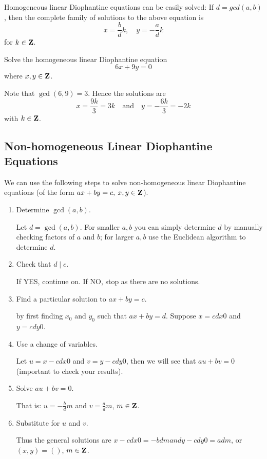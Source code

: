 Homogeneous linear Diophantine equations can be easily solved: If $d=gcd(a,b)$, then the complete family of solutions to the above equation is
\[x=\frac{b}{d}k,\quad y=-\frac{a}{d}k\]
for $k\in\mathbf Z$.

\begin{exercise}
Solve the homogeneous linear Diophantine equation
\[6x+9y=0\]
where $x,y\in\mathbf Z$.
\end{exercise}
\begin{solution}
Note that $\gcd(6,9)=3$. Hence the solutions are
\[x=\frac{9k}{3}=3k \quad \text{and} \quad y=-\frac{6k}{3}=-2k\]
with $k\in\mathbf Z$.
\end{solution}

\subsection{Non-homogeneous Linear Diophantine Equations}
We can use the following steps to solve non-homogeneous linear Diophantine equations (of the form $ax+by=c,\:x,y\in\mathbf Z$).

\begin{enumerate}
\item Determine $\gcd(a,b)$.

Let $d=\gcd(a,b)$. For smaller $a,b$ you can simply determine $d$ by manually checking factors of $a$ and $b$; for larger $a,b$ use the Euclidean algorithm to determine $d$.

\item Check that $d\mid c$. 

If YES, continue on. If NO, stop as there are no solutions.

\item Find a particular solution to $ax+by=c$.

by first finding $x_0$ and $y_0$ such that $ax+by=d$. Suppose $x=cdx0$ and $y=cdy0$.

\item Use a change of variables.

Let $u=x-cdx0$ and $v=y-cdy0$, then we will see that $au+bv=0$ (important to check your results).

\item Solve $au+bv=0$.

That is: $u=-\frac{b}{d}m$ and $v=\frac{a}{d}m$, $m\in\mathbf Z$.
  
\item Substitute for $u$ and $v$.

Thus the general solutions are $x-cdx0=-bdm
  and  y-cdy0=adm$, or $(x,y)=()$, $m\in\mathbf Z$.
\end{enumerate}

